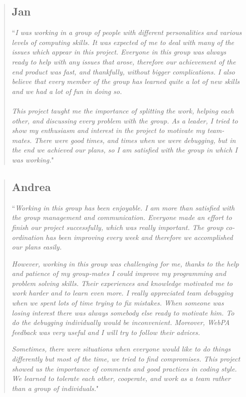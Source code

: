 \documentclass[9pt]{article}
\begin{document}
\begin{quote}
\subsection*{Jan}
``\textit{I was working in a group of people with different personalities and various levels of computing skills. It was expected of me to deal with many of the issues which appear in this project. Everyone in this group was always ready to help with any issues that arose, therefore our achievement of the end product was fast, and thankfully, without bigger complications. I also believe that every member of the group has learned quite a lot of new skills and we had a lot of fun in doing so.} \\\\

\textit{This project taught me the importance of splitting the work, helping each other, and discussing every problem with the group. As a leader, I tried to show my enthusiasm and interest in the project to motivate my team-mates. There were good times, and times when we were debugging, but in the end we achieved our plans, so I am satisfied with the group in which I was working.}"

\end{quote}

\begin{quote}
\subsection*{Andrea}
``\textit{Working in this group has been enjoyable. I am more than satisfied with the group management and communication. Everyone made an effort to finish our project successfully, which was really important. The group co-ordination has been improving every week and therefore we accomplished our plans easily.}

\textit{However, working in this group was challenging for me, thanks to the help and patience of my group-mates I could improve my programming and problem solving skills. Their experiences and knowledge motivated me to work harder and to learn even more. I really appreciated team debugging when we spent lots of time trying to fix mistakes.  When someone was losing interest there was always somebody else ready to motivate him. To do the debugging individually would be inconvenient. Moreover, WebPA feedback was very useful and I will try to follow their advices.}

\textit{Sometimes, there were situations when everyone would like to do things differently but most of the time, we tried to find compromises. This project showed us the importance of comments and good practices in coding style. We learned to tolerate each other, cooperate, and work as a team rather than a group of individuals.}"
\end{quote}
\end{document}
